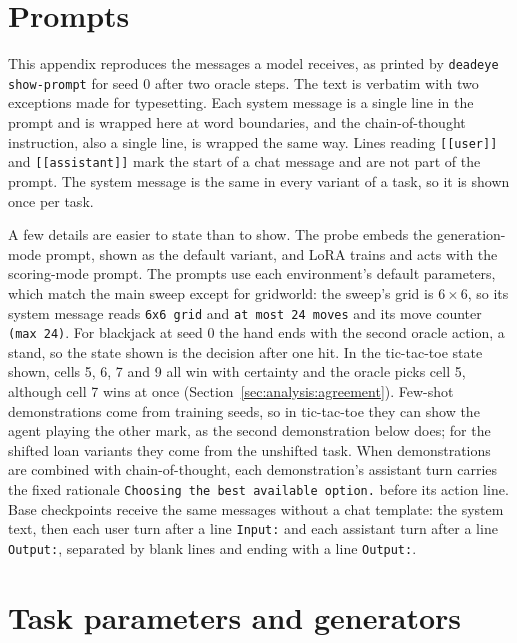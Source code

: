 
\section{Prompts}
\label{app:prompts}

This appendix reproduces the messages a model receives, as printed by \texttt{deadeye show-prompt} for seed 0 after two oracle steps. The text is verbatim with two exceptions made for typesetting. Each system message is a single line in the prompt and is wrapped here at word boundaries, and the chain-of-thought instruction, also a single line, is wrapped the same way. Lines reading \texttt{[[user]]} and \texttt{[[assistant]]} mark the start of a chat message and are not part of the prompt. The system message is the same in every variant of a task, so it is shown once per task.

A few details are easier to state than to show. The probe embeds the generation-mode prompt, shown as the default variant, and LoRA trains and acts with the scoring-mode prompt. The prompts use each environment's default parameters, which match the main sweep except for gridworld: the sweep's grid is $6\times6$, so its system message reads \texttt{6x6 grid} and \texttt{at most 24 moves} and its move counter \texttt{(max 24)}. For blackjack at seed 0 the hand ends with the second oracle action, a stand, so the state shown is the decision after one hit. In the tic-tac-toe state shown, cells 5, 6, 7 and 9 all win with certainty and the oracle picks cell 5, although cell 7 wins at once (Section~\ref{sec:analysis:agreement}). Few-shot demonstrations come from training seeds, so in tic-tac-toe they can show the agent playing the other mark, as the second demonstration below does; for the shifted loan variants they come from the unshifted task. When demonstrations are combined with chain-of-thought, each demonstration's assistant turn carries the fixed rationale \texttt{Choosing the best available option.} before its action line. Base checkpoints receive the same messages without a chat template: the system text, then each user turn after a line \texttt{Input:} and each assistant turn after a line \texttt{Output:}, separated by blank lines and ending with a line \texttt{Output:}.



\section{Task parameters and generators}
\label{app:envs}

